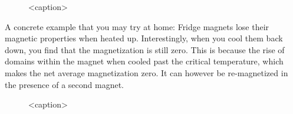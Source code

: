 \begin{figure}[htbp]
    \centering
    
    \caption{<caption>}
    \label{<label>}
\end{figure}

A concrete example that you may try at home: Fridge magnets lose their magnetic properties when heated up. Interestingly, when you cool them back down, you find that the magnetization is still zero. This is because the rise of domains within the magnet when cooled past the critical temperature, which makes the net average magnetization zero. It can however be re-magnetized in the presence of a second magnet.

\begin{figure}[htbp]
    \centering
    
    \caption{<caption>}
    \label{<label>}
\end{figure}

